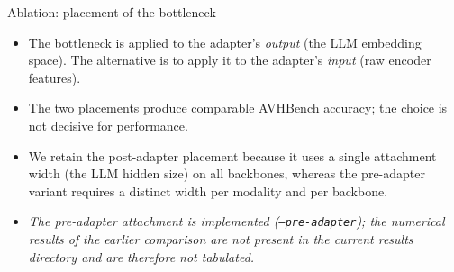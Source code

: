 \documentclass[aspectratio=169,11pt]{beamer}
\begin{document}
\begin{frame}{Ablation: placement of the bottleneck}
\centering
{}
\vspace{0.6em}
\begin{itemize}\footnotesize
\item The bottleneck is applied to the adapter's \emph{output} (the LLM embedding space). The
alternative is to apply it to the adapter's \emph{input} (raw encoder features).
\item The two placements produce comparable AVHBench accuracy; the choice is not decisive for
performance.
\item We retain the post-adapter placement because it uses a single attachment width (the LLM
hidden size) on all backbones, whereas the pre-adapter variant requires a distinct width per
modality and per backbone.
\item[] {\footnotesize\emph{The pre-adapter attachment is implemented (\texttt{--pre-adapter}); the
numerical results of the earlier comparison are not present in the current results directory and are
therefore not tabulated.}}
\end{itemize}
\end{frame}
\end{document}
